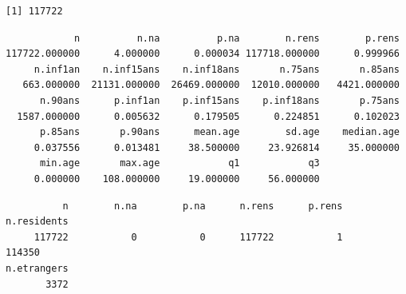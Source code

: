\documentclass[]{article}
\newenvironment{Shaded}{\begin{snugshade}}{\end{snugshade}}
\newcommand{\KeywordTok}[1]{\textcolor[rgb]{0.13,0.29,0.53}{\textbf{{#1}}}}
\newcommand{\StringTok}[1]{\textcolor[rgb]{0.31,0.60,0.02}{{#1}}}
\newcommand{\CommentTok}[1]{\textcolor[rgb]{0.56,0.35,0.01}{\textit{{#1}}}}
\newcommand{\OtherTok}[1]{\textcolor[rgb]{0.56,0.35,0.01}{{#1}}}
\newcommand{\NormalTok}[1]{{#1}}
\begin{document}
\begin{Shaded}
\end{Shaded}

\begin{verbatim}
[1] 117722
\end{verbatim}

\begin{Shaded}
\end{Shaded}

\begin{verbatim}
            n          n.na          p.na        n.rens        p.rens 
117722.000000      4.000000      0.000034 117718.000000      0.999966 
     n.inf1an    n.inf15ans    n.inf18ans       n.75ans       n.85ans 
   663.000000  21131.000000  26469.000000  12010.000000   4421.000000 
      n.90ans      p.inf1an    p.inf15ans    p.inf18ans       p.75ans 
  1587.000000      0.005632      0.179505      0.224851      0.102023 
      p.85ans       p.90ans      mean.age        sd.age    median.age 
     0.037556      0.013481     38.500000     23.926814     35.000000 
      min.age       max.age            q1            q3 
     0.000000    108.000000     19.000000     56.000000 
\end{verbatim}

\begin{Shaded}
\end{Shaded}

\begin{verbatim}
          n        n.na        p.na      n.rens      p.rens n.residents 
     117722           0           0      117722           1      114350 
n.etrangers 
       3372 
\end{verbatim}
\end{document}
